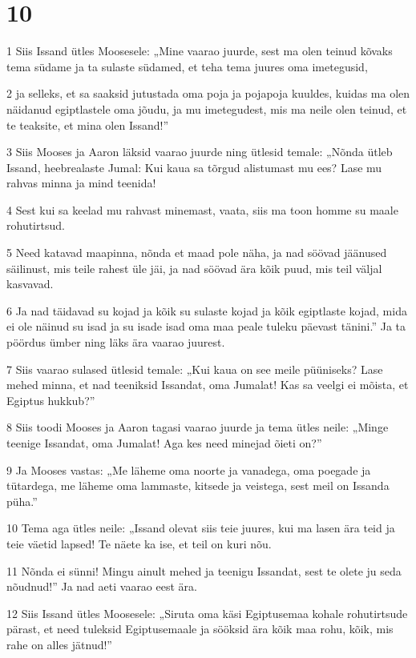 \chapter{10}

\par 1 Siis Issand ütles Moosesele: „Mine vaarao juurde, sest ma olen teinud kõvaks tema südame ja ta sulaste südamed, et teha tema juures oma imetegusid,
\par 2 ja selleks, et sa saaksid jutustada oma poja ja pojapoja kuuldes, kuidas ma olen näidanud egiptlastele oma jõudu, ja mu imetegudest, mis ma neile olen teinud, et te teaksite, et mina olen Issand!”
\par 3 Siis Mooses ja Aaron läksid vaarao juurde ning ütlesid temale: „Nõnda ütleb Issand, heebrealaste Jumal: Kui kaua sa tõrgud alistumast mu ees? Lase mu rahvas minna ja mind teenida!
\par 4 Sest kui sa keelad mu rahvast minemast, vaata, siis ma toon homme su maale rohutirtsud.
\par 5 Need katavad maapinna, nõnda et maad pole näha, ja nad söövad jäänused säilinust, mis teile rahest üle jäi, ja nad söövad ära kõik puud, mis teil väljal kasvavad.
\par 6 Ja nad täidavad su kojad ja kõik su sulaste kojad ja kõik egiptlaste kojad, mida ei ole näinud su isad ja su isade isad oma maa peale tuleku päevast tänini.” Ja ta pöördus ümber ning läks ära vaarao juurest.
\par 7 Siis vaarao sulased ütlesid temale: „Kui kaua on see meile püüniseks? Lase mehed minna, et nad teeniksid Issandat, oma Jumalat! Kas sa veelgi ei mõista, et Egiptus hukkub?”
\par 8 Siis toodi Mooses ja Aaron tagasi vaarao juurde ja tema ütles neile: „Minge teenige Issandat, oma Jumalat! Aga kes need minejad õieti on?”
\par 9 Ja Mooses vastas: „Me läheme oma noorte ja vanadega, oma poegade ja tütardega, me läheme oma lammaste, kitsede ja veistega, sest meil on Issanda püha.”
\par 10 Tema aga ütles neile: „Issand olevat siis teie juures, kui ma lasen ära teid ja teie väetid lapsed! Te näete ka ise, et teil on kuri nõu.
\par 11 Nõnda ei sünni! Mingu ainult mehed ja teenigu Issandat, sest te olete ju seda nõudnud!” Ja nad aeti vaarao eest ära.
\par 12 Siis Issand ütles Moosesele: „Siruta oma käsi Egiptusemaa kohale rohutirtsude pärast, et need tuleksid Egiptusemaale ja sööksid ära kõik maa rohu, kõik, mis rahe on alles jätnud!”
